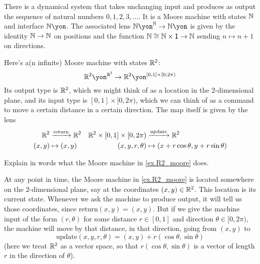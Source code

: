 \documentclass[Book-Poly]{subfiles}
\begin{document}
\begin{example}\label{ex.counting_trajectory}
There is a dynamical system that takes unchanging input and produces as output the sequence of natural numbers $0,1,2,3,\ldots.$ It is a Moore machine with states $\mathbb{N}$ and interface $\nn\yon$. The associated lens $\nn\yon^\nn\to\nn\yon$ is given by the identity $\mathbb{N} \to \mathbb{N}$ on positions and the function $\mathbb{N} \cong \mathbb{N} \times \textsf{1} \to \mathbb{N}$ sending $n\mapsto n+1$ on directions.
\end{example}

\begin{example}\label{ex.R2_moore}
Here's a(n infinite) Moore machine with states $\mathbb{R}^{\textsf{2}}$:
\[
\rr^\2\yon^{\rr^\2}\to\rr^\2\yon^{[0,1]\times[0,2\pi)}%
\]
Its output type is $\mathbb{R}^{\textsf{2}}$, which we might think of as a location in the 2-dimensional plane, and its input type is $[0,1]\times[0,2\pi)$, which we can think of as a command to move a certain distance in a certain direction. The map itself is given by the lens
\begin{align*}
  \mathbb{R}^{\textsf{2}}&\xrightarrow{\text{return}}\mathbb{R}^{\textsf{2}}&
  \mathbb{R}^{\textsf{2}}\times[0,1]\times[0,2\pi)&\xrightarrow{\text{update}}\mathbb{R}^{\textsf{2}}
  	\\
  (x,y)&\mapsto(x,y)&
  (x,y,r,\theta)&\mapsto(x+r\cos\theta, y+r\sin\theta)
\end{align*}
\end{example}

\begin{exercise}
Explain in words what the Moore machine in \cref{ex.R2_moore} does.
\begin{solution}
At any point in time, the Moore machine in \cref{ex.R2_moore} is located somewhere on the $2$-dimensional plane, say at the coordinates $(x, y) \in \mathbb{R}^{\textsf{2}}$.
This location is its current state.
Whenever we ask the machine to produce output, it will tell us those coordinates, since $\text{return}(x, y) = (x, y)$.
But if we give the machine input of the form $(r, \theta)$ for some distance $r \in [0,1]$ and direction $\theta \in [0, 2\pi)$, the machine will move by that distance, in that direction, going from $(x, y)$ to
\[
    \text{update}(x,y,r,\theta) = (x,y) + r(\cos\theta, \sin\theta)
\]
(here we treat $\mathbb{R}^{\textsf{2}}$ as a vector space, so that $r(\cos\theta, \sin\theta)$ is a vector of length $r$ in the direction of $\theta$).
\end{solution}
\end{exercise}
\end{document}
